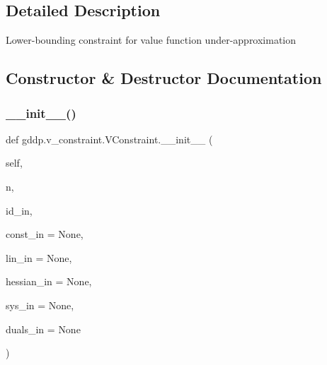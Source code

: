 \subsection{Detailed Description}
\begin{DoxyVerb}Lower-bounding constraint for value function under-approximation\end{DoxyVerb}
 

\subsection{Constructor \& Destructor Documentation}
\mbox{\label{classgddp_1_1v__constraint_1_1_v_constraint_a9a4aa84e529efa6fea7170e47d17cf0c}} 
\subsubsection{\texorpdfstring{\_\_init\_\_()}{\_\_init\_\_()}}
{\footnotesize\ttfamily def gddp.\+v\+\_\+constraint.\+V\+Constraint.\+\_\+\+\_\+init\+\_\+\+\_\+ (\begin{DoxyParamCaption}\item[{}]{self,  }\item[{}]{n,  }\item[{}]{id\+\_\+in,  }\item[{}]{const\+\_\+in = {\ttfamily None},  }\item[{}]{lin\+\_\+in = {\ttfamily None},  }\item[{}]{hessian\+\_\+in = {\ttfamily None},  }\item[{}]{sys\+\_\+in = {\ttfamily None},  }\item[{}]{duals\+\_\+in = {\ttfamily None} }\end{DoxyParamCaption})}

